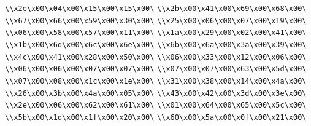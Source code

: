 \verb|\\x2e\x00\x04\x00\x15\x00\x15\x00\|\newline
\verb|\\x2b\x00\x41\x00\x69\x00\x68\x00\|\newline
\verb|\\x67\x00\x66\x00\x59\x00\x30\x00\|\newline
\verb|\\x25\x00\x06\x00\x07\x00\x19\x00\|\newline
\verb|\\x06\x00\x58\x00\x57\x00\x11\x00\|\newline
\verb|\\x1a\x00\x29\x00\x02\x00\x41\x00\|\newline
\verb|\\x1b\x00\x6d\x00\x6c\x00\x6e\x00\|\newline
\verb|\\x6b\x00\x6a\x00\x3a\x00\x39\x00\|\newline
\verb|\\x4c\x00\x41\x00\x28\x00\x50\x00\|\newline
\verb|\\x06\x00\x33\x00\x12\x00\x06\x00\|\newline
\verb|\\x06\x00\x06\x00\x07\x00\x07\x00\|\newline
\verb|\\x07\x00\x07\x00\x63\x00\x5d\x00\|\newline
\verb|\\x07\x00\x08\x00\x1c\x00\x1e\x00\|\newline
\verb|\\x31\x00\x38\x00\x14\x00\x4a\x00\|\newline
\verb|\\x26\x00\x3b\x00\x4a\x00\x05\x00\|\newline
\verb|\\x43\x00\x42\x00\x3d\x00\x3e\x00\|\newline
\verb|\\x2e\x00\x06\x00\x62\x00\x61\x00\|\newline
\verb|\\x01\x00\x64\x00\x65\x00\x5c\x00\|\newline
\verb|\\x5b\x00\x1d\x00\x1f\x00\x20\x00\|\newline
\verb|\\x60\x00\x5a\x00\x0f\x00\x21\x00\|\newline
